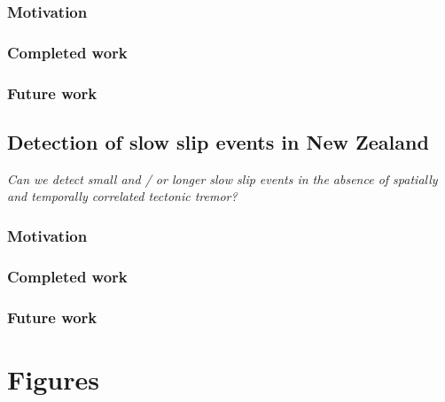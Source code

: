 \documentclass[letterpaper, 12pt]{article}
\begin{document}
\subsubsection*{Motivation}

\subsubsection*{Completed work}

\subsubsection*{Future work}

\subsection{Detection of slow slip events in New Zealand}

\textit{Can we detect small and / or longer slow slip events in the absence of spatially and temporally correlated tectonic tremor?}

\subsubsection*{Motivation}

\subsubsection*{Completed work}

\subsubsection*{Future work}

\newpage
\setcounter{page}{1}




\newpage
\setcounter{page}{1}

\section*{Figures}
\end{document}
